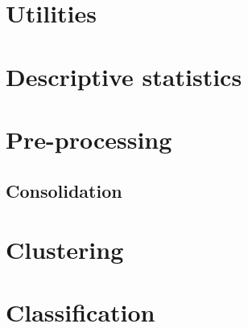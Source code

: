 \documentclass[../thesis.tex]{subfiles}
\begin{document}


\section{Utilities}
\label{sec:utilities}



\section{Descriptive statistics}
\label{sec:app_desc_stat}



\section{Pre-processing}
\label{sec:pre_proc}


\newpage
\subsection{Consolidation}
\label{sec:consolidation}



\section{Clustering}
\label{sec:clust}



\section{Classification}
\label{sec:classifi}


\end{document}
